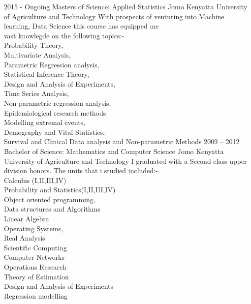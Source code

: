 \documentclass[9pt]{developercv} %
\begin{document}

\begin{entrylist}
	\entry
		{2015 - Ongoing}
		{Masters of Science: Applied Statistics	}
		{Jomo Kenyatta University of Agriculture and Technology	}
{		With prospects of venturing into Machine learning, Data Science this course has equipped me \\
	     vast knowlegde on the following topics:- \\Probability Theory,\\ Multivariate Analysis,\\ Parametric Regression analysis,\\
     Statistical Inference Theory,\\ Design and Analysis of Experiments,\\ Time Series Analysis,\\ Non parametric regression analysis,\\ Epidemiological research methods\\
 Modelling extremal events,\\ Demography and Vital Statistics,\\ Survival and Clinical Data analysis and Non-parametric Methods}
	\entry
		{2009 -- 2012}
		{Bachelor of Science: Mathematics and Computer Science}
		{Jomo Kenyatta University of Agriculture and Technology	}
		{I  graduated with a Second class upper division honors. The units that i studied included:-\\ Calculus (I,II,III,IV)\\ Probability and Statistics(I,II,III,IV)\\Object oriented programming,\\
		Data structures and Algorithms\\ Linear Algebra\\ Operating Systems, \\ Real Analysis \\Scientific Computing \\ Computer Networks \\ Operations Research \\ Theory of Estimation\\ Design and Analysis of Experiments\\Regression modelling\\\\\\\\\\\\\\\\\\\\\\\\\\}
\end{entrylist}
\end{document}

